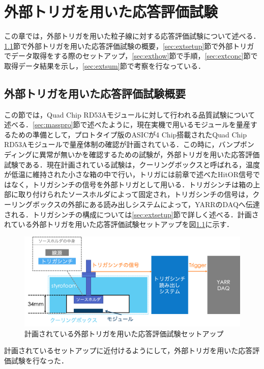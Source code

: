 \chapter{外部トリガを用いた応答評価試験}
この章では，外部トリガを用いた粒子線に対する応答評価試験について述べる．\ref{sec:extplan}節で外部トリガを用いた応答評価試験の概要，\ref{sec:extsetup}節で外部トリガでデータ取得をする際のセットアップ，\ref{sec:exthow}節で手順，\ref{sec:extconc}節で取得データ結果を示し，\ref{sec:extsum}節で考察を行なっている．

\section{外部トリガを用いた応答評価試験概要}
\label{sec:extplan}
この節では，Quad Chip RD53Aモジュールに対して行われる品質試験について述べる．\ref{sec:masspro}節で述べたように，現在実機で用いるモジュールを量産するための準備として，プロトタイプ版のASICが4 $\mathrm{Chip}$搭載されたQuad Chip RD53Aモジュールで量産体制の確認が計画されている．この時に，バンプボンディングに異常が無いかを確認するための試験が，外部トリガを用いた応答評価試験である．現在計画されている試験は，クーリングボックスと呼ばれる，温度が低温に維持された小さな箱の中で行い，トリガには前章で述べたHitOR信号ではなく，トリガシンチの信号を外部トリガとして用いる．トリガシンチは箱の上部に取り付けられたソースホルダによって固定され，トリガシンチの信号は，クーリングボックスの外部にある読み出しシステムによって，YARRのDAQへ伝達される．トリガシンチの構成については\ref{sec:extsetup}節で詳しく述べる．計画されている外部トリガを用いた応答評価試験セットアップを図\ref{fig:trigplan}に示す．

\begin{figure}[h]
  \centering
  \includegraphics[width=15cm]{./figure/trigplan.png}
  \caption{計画されている外部トリガを用いた応答評価試験セットアップ}
  \label{fig:trigplan}
\end{figure}

計画されているセットアップに近付けるようにして，外部トリガを用いた応答評価試験を行なった．


